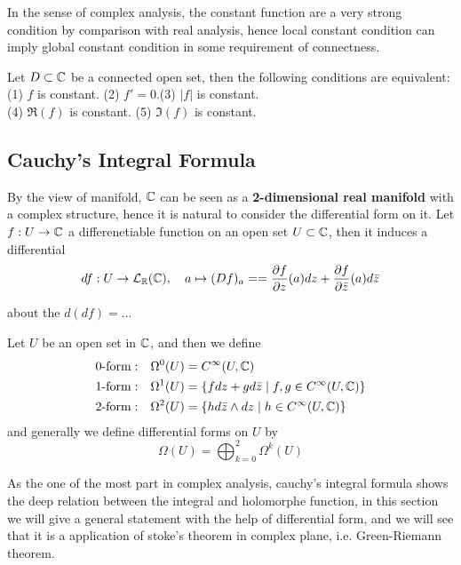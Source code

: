 In the sense of complex analysis, the constant function are a very strong condition by comparison with real analysis, hence local constant condition can imply global constant condition in some requirement of connectness.
\begin{corollary}
    Let \(D \subset \mathbb{C}\) be a connected open set, then the following conditions are equivalent:\\
    (1) \(f\) is constant. \qquad (2) \(f' = 0\).\qquad  (3) \(|f|\) is constant.\\
    (4) \(\Re(f)\) is constant. \qquad (5) \(\Im(f)\) is constant. 
\end{corollary}

\subsection{Cauchy's Integral Formula}

By the view of manifold, \(\mathbb{C}\) can be seen as a \textbf{2-dimensional real manifold} with a complex structure, hence it is natural to consider the differential form on it. Let \(f: U \to \mathbb{C}\) a differenetiable function on an open set \(U \subset \mathbb{C}\), then it induces a differential
\[df: U \to \mathcal{L}_{\mathbb{R}}(\mathbb{C}), \quad a \mapsto (Df)_a = = \frac{\partial f}{\partial z}(a) dz + \frac{\partial f}{\partial \bar{z}}(a) d\bar{z}\]

about the \(d(df) = ...\)

\begin{definition}
    Let \(U\) be an open set in \(\mathbb{C}\), and then we define 
    \begin{align*}
        \text{0-form}: & \quad \Omega^0(U) = C^{\infty}(U,\mathbb{C}) \\
        \text{1-form}: & \quad \Omega^1(U) = \{f dz + g d\bar{z} \mid f,g \in C^{\infty}(U,\mathbb{C})\}\\
        \text{2-form}: & \quad \Omega^2(U) = \{h d\bar{z} \wedge dz \mid h \in C^{\infty}(U,\mathbb{C})\}
    \end{align*}
    and generally we define differential forms on \(U\) by
    \[\Omega(U) = \bigoplus_{k=0}^2 \Omega^k(U)\]
\end{definition}




As the one of the most part in complex analysis, cauchy's integral formula shows the deep relation between the integral and holomorphe function, in this section we will give a general statement with the help of differential form, and we will see that it is a application of stoke's theorem in complex plane, i.e. Green-Riemann theorem.


